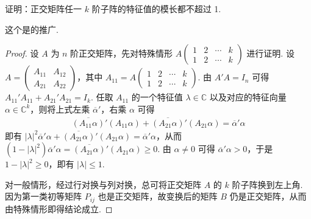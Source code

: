 \documentclass[../../main.tex]{subfiles}%
\begin{document}
\begin{proposition}\label{proposition:例9.46}
证明：正交矩阵任一 \(k\) 阶子阵的特征值的模长都不超过 1.
\end{proposition}
\begin{remark}
这个是的推广.
\end{remark}
\begin{proof}
设 \(A\) 为 \(n\) 阶正交矩阵，先对特殊情形 \(A\begin{pmatrix}
1 & 2 & \cdots & k \\
1 & 2 & \cdots & k
\end{pmatrix}\) 进行证明. 设 \(A = \begin{pmatrix}
A_{11} & A_{12} \\
A_{21} & A_{22}
\end{pmatrix}\)，其中 \(A_{11} = A\begin{pmatrix}
1 & 2 & \cdots & k \\
1 & 2 & \cdots & k
\end{pmatrix}\). 由 \(A'A = I_n\) 可得 \(A_{11}'A_{11} + A_{21}'A_{21} = I_k\). 任取 \(A_{11}\) 的一个特征值 \(\lambda \in \mathbb{C}\) 以及对应的特征向量 \(\alpha \in \mathbb{C}^k\)，则将上式左乘 \(\overline{\alpha}'\)，右乘 \(\alpha\) 可得
\begin{align*}
\overline{(A_{11}\alpha)}'(A_{11}\alpha) + \overline{(A_{21}\alpha)}'(A_{21}\alpha) = \overline{\alpha}'\alpha
\end{align*}
即有 \(|\lambda|^2\overline{\alpha}'\alpha + \overline{(A_{21}\alpha)}'(A_{21}\alpha) = \overline{\alpha}'\alpha\)，从而 \((1 - |\lambda|^2)\overline{\alpha}'\alpha = \overline{(A_{21}\alpha)}'(A_{21}\alpha) \geqslant  0\). 由 \(\alpha \neq 0\) 可得 \(\overline{\alpha}'\alpha > 0\)，于是 \(1 - |\lambda|^2 \geqslant  0\)，即有 \(|\lambda| \leqslant  1\). 

对一般情形，经过行对换与列对换，总可将正交矩阵 \(A\) 的 \(k\) 阶子阵换到左上角. 因为第一类初等矩阵 \(P_{ij}\) 也是正交矩阵，故变换后的矩阵 \(B\) 仍是正交矩阵，从而由特殊情形即得结论成立.
\end{proof}
\end{document}
